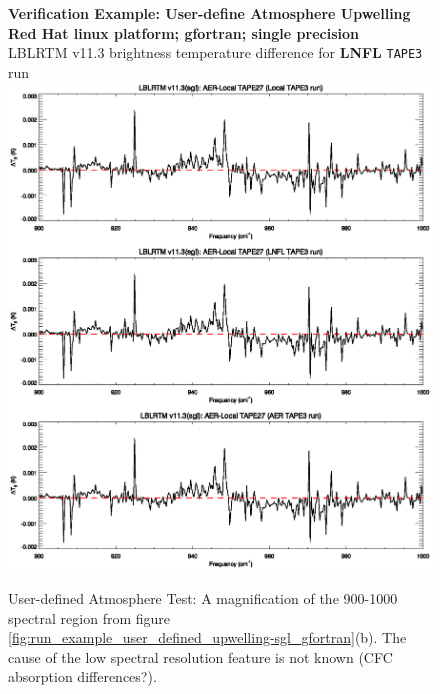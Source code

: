 \begin{figure}[htp]
  \centering
  \qquad\sffamily\textbf{Verification Example: User-define Atmosphere Upwelling}\\
  \qquad\sffamily\textbf{Red Hat linux platform; gfortran; single precision}\\
  \qquad\textsf{LBLRTM v11.3 brightness temperature difference for \textbf{LNFL} \texttt{TAPE3} run}\\
  \includegraphics[bb=82 313 534 472,clip,scale=1.0]{graphics/run_example_user_defined_upwelling/gfortran/sgl_900-1000.eps}
  \caption{User-defined Atmosphere Test: A magnification of the 900-1000\invcm{} spectral region from figure \ref{fig:run_example_user_defined_upwelling-sgl_gfortran}(b). The cause of the low spectral resolution feature is not known (CFC absorption differences?).}
  \label{fig:run_example_user_defined_upwelling-sgl_900-1000}
\end{figure}

